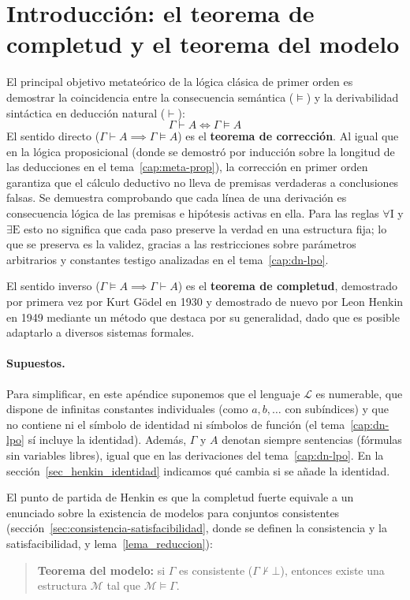\section{Introducción: el teorema de completud y el teorema del modelo}

El principal objetivo metateórico de la lógica clásica de primer orden es demostrar la coincidencia entre la consecuencia semántica ($\models$) y la derivabilidad sintáctica en deducción natural ($\vdash$):
\[
\Gamma \vdash A \iff \Gamma \models A
\]
El sentido directo ($\Gamma \vdash A \implies \Gamma \models A$) es el
\textbf{teorema de corrección}. Al igual que en la lógica proposicional
(donde se demostró por inducción sobre la longitud de las deducciones en el
tema~\ref{cap:meta-prop}), la corrección en primer orden garantiza que el cálculo deductivo
no lleva de premisas verdaderas a conclusiones falsas. Se demuestra
comprobando que cada línea de una derivación es consecuencia lógica de las
premisas e hipótesis activas en ella. Para las reglas $\forall\text{I}$ y
$\exists\text{E}$ esto no significa que cada paso preserve la verdad en
una estructura fija; lo que se preserva es la validez, gracias a las restricciones sobre parámetros arbitrarios y
constantes testigo analizadas en el tema~\ref{cap:dn-lpo}.

El sentido inverso ($\Gamma \models A \implies \Gamma \vdash A$) es el
\textbf{teorema de completud}, demostrado por primera vez por Kurt
Gödel en 1930 y demostrado de nuevo por Leon Henkin en 1949 mediante un método
que destaca por su generalidad, dado que es posible adaptarlo a
diversos sistemas formales. 

\paragraph{Supuestos.} Para simplificar, en este apéndice suponemos que el lenguaje $\mathcal{L}$ es numerable, que dispone de infinitas constantes individuales (como $a, b, \dots$ con subíndices) y que no contiene ni el símbolo de identidad ni símbolos de función (el tema~\ref{cap:dn-lpo} sí incluye la identidad). Además, $\Gamma$ y $A$ denotan siempre sentencias (fórmulas sin variables libres), igual que en las derivaciones del tema~\ref{cap:dn-lpo}. En la sección~\ref{sec_henkin_identidad} indicamos qué cambia si se añade la identidad.

El punto de partida de Henkin es que la completud fuerte equivale a un enunciado sobre la existencia de modelos para conjuntos consistentes (sección~\ref{sec:consistencia-satisfacibilidad}, donde se definen la consistencia y la satisfacibilidad, y lema~\ref{lema_reduccion}):
\begin{quote}
\textbf{Teorema del modelo:} si $\Gamma$ es consistente ($\Gamma \nvdash \bot$), entonces existe una estructura $\mathcal{M}$ tal que $\mathcal{M} \models \Gamma$.
\end{quote}

